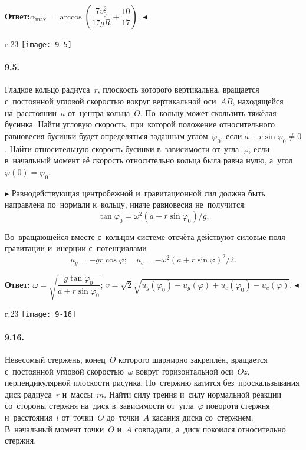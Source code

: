 \documentclass{weekly}
\begin{document}
\medskip
\textbf{Ответ:}\qquad $\alpha_{\max} =
\arccos \left( \dfrac{7v_0^2}{17gR} + \dfrac{10}{17} \right)$.
\hfill $\blacktriangleleft$


\begin{wrapfigure}{r}{.23\textwidth}\vspace{-5mm}
\texttt{[image: 9-5]}
\end{wrapfigure}
\paragraph{9.5.} Гладкое кольцо радиуса~$r$, плоскость которого
вертикальна, вращается с~постоянной угловой скоростью вокруг
вертикальной оси~$AB$, находящейся на~расстоянии~$a$
от~центра кольца~$O$. По~кольцу может скользить тяжёлая бусинка.
Найти угловую скорость, при~которой положение относительного
равновесия бусинки будет определяться заданным углом~$\varphi_0$,
если $a + r\sin\varphi_0 \neq 0$. Найти относительную скорость
бусинки в~зависимости от~угла~$\varphi$, если в~начальный момент
её скорость относительно кольца была равна нулю,
а~угол~$\varphi(0) = \varphi_0$.

$\blacktriangleright$ Равнодействующая центробежной и~гравитационной
сил должна быть направлена по~нормали к~кольцу, иначе равновесия
не~получится:
\begin{equation}
    \tan\varphi_0 = \omega^2(a + r\sin\varphi_0)/g.
\end{equation}

Во~вращающейся вместе с~кольцом системе отсчёта действуют
силовые поля гравитации и~инерции с~потенциалами
\begin{equation}
    u_g = -gr\cos\varphi; \quad
    u_c = -\omega^2 (a + r\sin\varphi)^2/2.
\end{equation}

\textbf{Ответ:}\qquad
$\omega = \sqrt{\dfrac{g \tan\varphi_0}{a + r\sin\varphi_0}}$; \quad
$v = \sqrt{2} \sqrt{u_g(\varphi_0) - u_g(\varphi)
    + u_c(\varphi_0) - u_c(\varphi)}$.
\hfill $\blacktriangleleft$


\begin{wrapfigure}{r}{.23\textwidth}
\texttt{[image: 9-16]}
\end{wrapfigure}
\paragraph{9.16.} Невесомый стержень, конец~$O$ которого
шарнирно закреплён, вращается с~постоянной угловой скоростью~$\omega$
вокруг горизонтальной оси~$Oz$, перпендикулярной плоскости рисунка.
По~стержню катится без~проскальзывания диск радиуса~$r$ и~массы~$m$.
Найти силу трения и~силу нормальной реакции со~стороны стержня
на~диск в~зависимости от~угла~$\varphi$ поворота стержня
и~расстояния~$l$ от~точки~$O$ до~точки~$A$ касания диска со~стержнем.
В~начальный момент точки~$O$ и~$A$ совпадали, а~диск покоился
относительно стержня.
\end{document}
